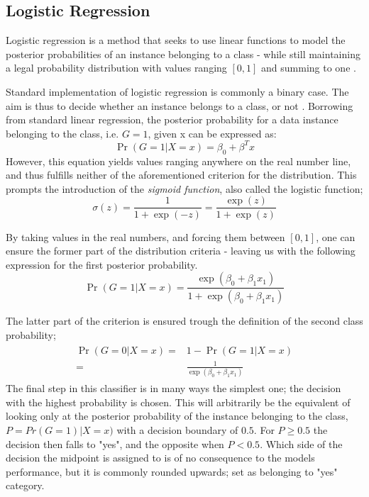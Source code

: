 \subsection{Logistic Regression}
Logistic regression is a method that seeks to use linear functions to model the posterior probabilities of an instance belonging to a class - while still maintaining a legal probability distribution with values ranging $[0,1]$ and summing to one \cite[p.119]{hastie}. 

Standard implementation of logistic regression is commonly a binary case. The aim is thus to decide whether an instance belongs to a class, or not \cite[p. 78]{jm3}.  
Borrowing from standard linear regression, the posterior probability for a data instance belonging to the class, i.e. $G=1$, given x can be expressed as:  
\begin{equation}
\Pr(G=1|X=x)=\beta_0+\beta^Tx
\end{equation} 
However, this equation yields values ranging anywhere on the real number line, and thus fulfills neither of the aforementioned criterion for the distribution. This prompts the introduction of the \textit{sigmoid function}, also called the logistic function;
\begin{equation}\label{sigmoid}
    \sigma(z)=\frac{1}{1+\exp(-z)}=\frac{\exp(z)}{1+\exp(z)}
\end{equation}

By taking values in the real numbers, and forcing them between $[0,1]$, one can ensure the former part of the distribution criteria - leaving us with the following expression for the first posterior probability. 
\begin{equation}\label{priprob1}
\Pr(G=1|X=x)=\frac{\exp(\beta_0+\beta_1x_1)}{1+\exp(\beta_0+\beta_1x_1)}
\end{equation}

The latter part of the criterion is ensured trough the definition of the second class probability;
\begin{align}\label{priprob0}
    \begin{split}
    \Pr(G=0|X=x)=&1-\Pr(G=1|X=x) \\ =& 
    \frac{1}{\exp(\beta_0+\beta_1x_1)}
    \end{split}
\end{align}
The final step in this classifier is in many ways the simplest one; the decision with the highest probability is chosen. This will arbitrarily be the equivalent of looking only at the posterior probability of the instance belonging to the class, $P=Pr(G=1)|X=x)$ with a decision boundary of $0.5$. For $P\geq0.5$ the decision then falls to "yes", and the opposite when $P<0.5$. 
Which side of the decision the midpoint is assigned to is of no consequence to the models performance, but it is commonly rounded upwards; set as belonging to "yes" category.



